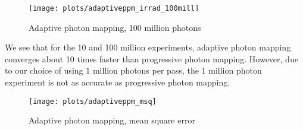 \begin{figure}
    \centering
    \texttt{[image: plots/adaptiveppm\_irrad\_100mill]}\\
    \caption{Adaptive photon mapping, 100 million photons}
    \label{fig:adaptive_irrad100}
\end{figure}

We see that for the 10 and 100 million experiments, adaptive photon mapping converges about 10 times faster than progressive photon mapping. However, due to our choice of using 1 million photons per pass, the 1 million photon experiment is not as accurate as progressive photon mapping.
\begin{figure}
    \centering
    \texttt{[image: plots/adaptiveppm\_msq]}\\
    \caption{Adaptive photon mapping, mean square error}
    \label{fig:adaptive_msq}
\end{figure}
